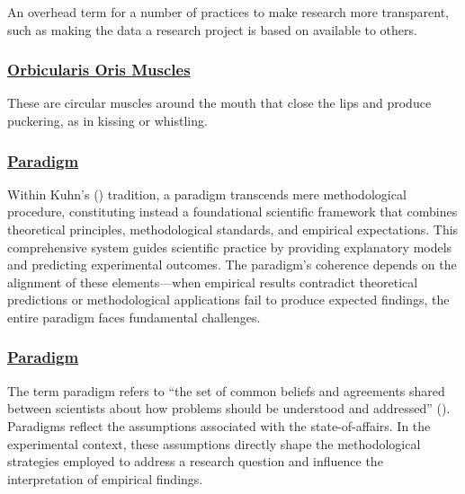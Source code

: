 \documentclass[
  letterpaper,
]{book}
\begin{document}
An overhead term for a number of practices to make research more
transparent, such as making the data a research project is based on
available to others.

\subsubsection*{\texorpdfstring{\hyperref[def-orbicularisoris]{Orbicularis
Oris
Muscles}}{Orbicularis Oris Muscles}}\label{orbicularis-oris-muscles}

These are circular muscles around the mouth that close the lips and
produce puckering, as in kissing or whistling.

\subsubsection*{\texorpdfstring{\hyperref[def-paradigm]{Paradigm}}{Paradigm}}\label{paradigm}

Within Kuhn's () tradition, a
paradigm transcends mere methodological procedure, constituting instead
a foundational scientific framework that combines theoretical
principles, methodological standards, and empirical expectations. This
comprehensive system guides scientific practice by providing explanatory
models and predicting experimental outcomes. The paradigm's coherence
depends on the alignment of these elements---when empirical results
contradict theoretical predictions or methodological applications fail
to produce expected findings, the entire paradigm faces fundamental
challenges.

\subsubsection*{\texorpdfstring{\hyperref[def-paradigm]{Paradigm}}{Paradigm}}\label{paradigm-1}

The term paradigm refers to ``the set of common beliefs and agreements
shared between scientists about how problems should be understood and
addressed'' (). Paradigms
reflect the assumptions associated with the state-of-affairs. In the
experimental context, these assumptions directly shape the
methodological strategies employed to address a research question and
influence the interpretation of empirical findings.
\end{document}
